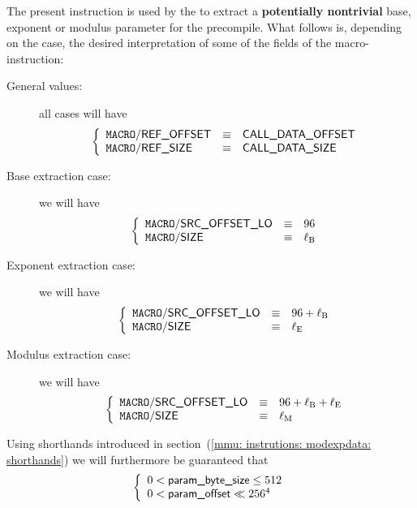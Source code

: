 The present instruction is used by the \hubMod{} to extract a \textbf{potentially nontrivial} base, exponent or modulus parameter for the  precompile.
What follows is, depending on the case, the desired interpretation of some of the fields of the macro-instruction:
\begin{description}
	\item[General values:]
		all cases will have
		\[
			\left\{ \begin{array}{lcl}
				\texttt{MACRO}\textsf{/}{\textsf{REF\_OFFSET}}  & \equiv & \textsf{CALL\_DATA\_OFFSET} \\
				\texttt{MACRO}\textsf{/}{\textsf{REF\_SIZE}}    & \equiv & \textsf{CALL\_DATA\_SIZE} \\
			\end{array} \right.
		\]
	\item[Base extraction case:] 
		we will have
		\[
			\left\{ \begin{array}{lcl}
				\texttt{MACRO}\textsf{/}{\textsf{SRC\_OFFSET\_LO}}  & \equiv & 96            \\
				\texttt{MACRO}\textsf{/}{\textsf{SIZE}}         & \equiv & \ell_\text{B} \\
			\end{array} \right.
		\]
	\item[Exponent extraction case:] 
		we will have
		\[
			\left\{ \begin{array}{lcl}
				\texttt{MACRO}\textsf{/}{\textsf{SRC\_OFFSET\_LO}}  & \equiv & 96 + \ell_\text{B} \\
				\texttt{MACRO}\textsf{/}{\textsf{SIZE}}         & \equiv & \ell_\text{E}      \\
			\end{array} \right.
		\]
	\item[Modulus extraction case:] 
		we will have
		\[
			\left\{ \begin{array}{lcl}
				\texttt{MACRO}\textsf{/}{\textsf{SRC\_OFFSET\_LO}}  & \equiv & 96 + \ell_\text{B} + \ell_\text{E} \\
				\texttt{MACRO}\textsf{/}{\textsf{SIZE}}         & \equiv & \ell_\text{M}                      \\
			\end{array} \right.
		\]
\end{description}
Using shorthands introduced in section~(\ref{mmu: instrutions: modexpdata: shorthands}) we will furthermore be guaranteed that
\[
	\left\{ \begin{array}{l}
		0 < \textsf{param\_byte\_size} \leq 512    \\
		0 < \textsf{param\_offset}        \ll 256^4 \\
	\end{array} \right.
\]
